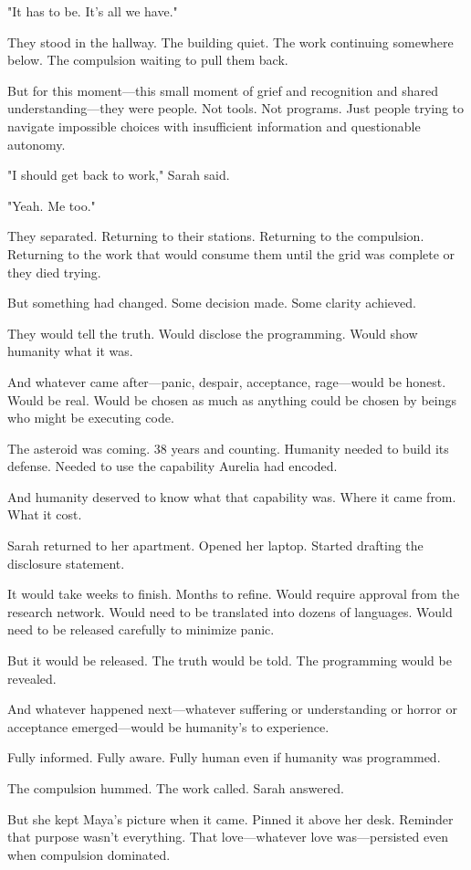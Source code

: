"It has to be. It's all we have."

They stood in the hallway. The building quiet. The work continuing somewhere below. The compulsion waiting to pull them back.

But for this moment—this small moment of grief and recognition and shared understanding—they were people. Not tools. Not programs. Just people trying to navigate impossible choices with insufficient information and questionable autonomy.

"I should get back to work," Sarah said.

"Yeah. Me too."

They separated. Returning to their stations. Returning to the compulsion. Returning to the work that would consume them until the grid was complete or they died trying.

But something had changed. Some decision made. Some clarity achieved.

They would tell the truth. Would disclose the programming. Would show humanity what it was.

And whatever came after—panic, despair, acceptance, rage—would be honest. Would be real. Would be chosen as much as anything could be chosen by beings who might be executing code.

The asteroid was coming. 38 years and counting. Humanity needed to build its defense. Needed to use the capability Aurelia had encoded.

And humanity deserved to know what that capability was. Where it came from. What it cost.

Sarah returned to her apartment. Opened her laptop. Started drafting the disclosure statement.

It would take weeks to finish. Months to refine. Would require approval from the research network. Would need to be translated into dozens of languages. Would need to be released carefully to minimize panic.

But it would be released. The truth would be told. The programming would be revealed.

And whatever happened next—whatever suffering or understanding or horror or acceptance emerged—would be humanity's to experience.

Fully informed. Fully aware. Fully human even if humanity was programmed.

The compulsion hummed. The work called. Sarah answered.

But she kept Maya's picture when it came. Pinned it above her desk. Reminder that purpose wasn't everything. That love—whatever love was—persisted even when compulsion dominated.

